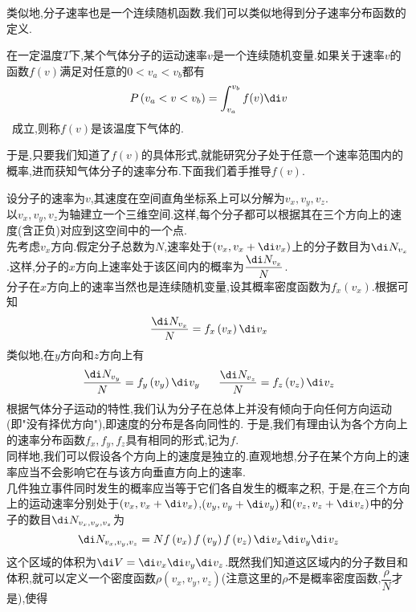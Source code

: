 \documentclass{ctexart}
\begin{document}
类似地,分子速率也是一个连续随机函数.我们可以类似地得到分子速率分布函数的定义.
\begin{definition}[1B.2.2 分子速率分布函数]
    在一定温度$T$下,某个气体分子的运动速率$v$是一个连续随机变量.如果关于速率$v$的函数$f(v)$满足对任意的$0<v_a<v_b$都有
    \[P\left(v_a<v<v_b\right)=\int_{v_a}^{v_b}f(v)\di v\]\
    成立,则称$f(v)$是该温度下气体的.
\end{definition}
于是,只要我们知道了$f(v)$的具体形式,就能研究分子处于任意一个速率范围内的概率,进而获知气体分子的速率分布.下面我们着手推导$f(v)$.
\begin{derivation}
    设分子的速率为$v$,其速度在空间直角坐标系上可以分解为$v_x,v_y,v_z$.\\
    以$v_x,v_y,v_z$为轴建立一个三维空间.这样,每个分子都可以根据其在三个方向上的速度(含正负)对应到这空间中的一个点.\\
    先考虑$v_x$方向.假定分子总数为$N$,速率处于$\left(v_x,v_x+\di v_x\right)$上的分子数目为$\di N_{v_x}$.这样,分子的$x$方向上速率处于该区间内的概率为$\dfrac{\di N_{v_x}}{N}$.\\
    分子在$x$方向上的速率当然也是连续随机变量,设其概率密度函数为$f_x\left(v_x\right)$.根据\tbf{1B.2.1}可知
    \begin{equation}
        \dfrac{\di N_{v_x}}{N}=f_x\left(v_x\right)\di v_x
    \end{equation}
    类似地,在$y$方向和$z$方向上有
    \begin{equation}
        \dfrac{\di N_{v_y}}{N}=f_y\left(v_y\right)\di v_y\ \ \ \ \ \dfrac{\di N_{v_z}}{N}=f_z\left(v_z\right)\di v_z
    \end{equation}
    根据气体分子运动的特性,我们认为分子在总体上并没有倾向于向任何方向运动(即"没有择优方向"),即速度的分布是各向同性的.%
    于是,我们有理由认为各个方向上的速率分布函数$f_x,f_y,f_z$具有相同的形式,记为$f$.\\
    同样地,我们可以假设各个方向上的速度是独立的.直观地想,分子在某个方向上的速率应当不会影响它在与该方向垂直方向上的速率.\\
    几件独立事件同时发生的概率应当等于它们各自发生的概率之积,%
    于是,在三个方向上的运动速率分别处于$\left(v_x,v_x+\di v_x\right)$,$\left(v_y,v_y+\di v_y\right)$和$\left(v_z,v_z+\di v_z\right)$中的分子的数目$\di N_{v_x,v_y,v_z}$为
    \begin{equation}
        \di N_{v_x,v_y,v_z}=Nf\left(v_x\right)f\left(v_y\right)f\left(v_z\right)\di v_x\di v_y\di v_z
    \end{equation}
    这个区域的体积为$\di V=\di v_x\di v_y\di v_z$.既然我们知道这区域内的分子数目和体积,就可以定义一个密度函数$\rho\left(v_x,v_y,v_z\right)$(注意这里的$\rho$不是概率密度函数,$\dfrac{\rho}{N}$才是),使得

\end{derivation}
\end{document}
